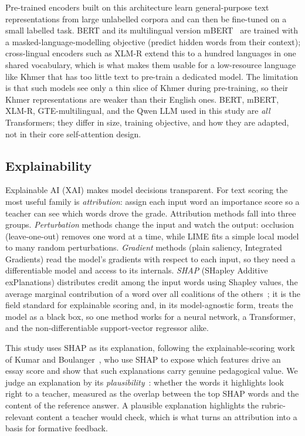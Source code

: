 Pre-trained encoders built on this architecture learn general-purpose text representations from large
unlabelled corpora and can then be fine-tuned on a small labelled task. BERT and its multilingual
version mBERT~\citep{devlin2019bert} are trained with a masked-language-modelling objective (predict
hidden words from their context); cross-lingual encoders such as XLM-R extend this to a hundred
languages in one shared vocabulary, which is what makes them usable for a low-resource language like
Khmer that has too little text to pre-train a dedicated model. The limitation is that such models see
only a thin slice of Khmer during pre-training, so their Khmer representations are weaker than their
English ones. BERT, mBERT, XLM-R, GTE-multilingual, and the Qwen LLM used in this study are \emph{all}
Transformers; they differ in size, training objective, and how they are adapted, not in their core
self-attention design.

\subsection{Explainability}
Explainable AI (XAI) makes model decisions transparent. For text scoring the most useful family is
\emph{attribution}: assign each input word an importance score so a teacher can see which words drove
the grade. Attribution methods fall into three groups. \emph{Perturbation} methods change the input and
watch the output: occlusion (leave-one-out) removes one word at a time, while LIME fits a simple local
model to many random perturbations. \emph{Gradient} methods (plain saliency, Integrated Gradients) read
the model's gradients with respect to each input, so they need a differentiable model and access to its
internals. \emph{SHAP} (SHapley Additive exPlanations) distributes credit among the input words using
Shapley values, the average marginal contribution of a word over all coalitions of the
others~\citep{lundberg2017shap}; it is the field standard for explainable scoring and, in its
model-agnostic form, treats the model as a black box, so one method works for a neural network, a
Transformer, and the non-differentiable support-vector regressor alike.

This study uses SHAP as its explanation, following the explainable-scoring work of Kumar and
Boulanger~\citep{kumar2020explainable}, who use SHAP to expose which features drive an essay score and
show that such explanations carry genuine pedagogical value. We judge an explanation by its
\emph{plausibility}~\citep{lyu2024faithfulsurvey}: whether the words it highlights look right to a
teacher, measured as the overlap between the top SHAP words and the content of the reference answer.
A plausible explanation highlights the rubric-relevant content a teacher would check, which is what
turns an attribution into a basis for formative feedback.


